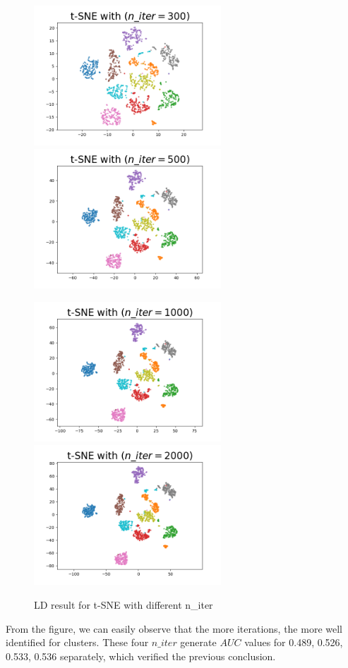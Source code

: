 \begin{figure}[H]
\centering  %
{
\label{Fig.sub.1}
\includegraphics[width=7cm,height=3.5cm\textwidth]{images/t-sne/tsne_niter_300.png}}
{
\label{Fig.sub.2}
\includegraphics[width=7cm,height=3.5cm\textwidth]{images/t-sne/tsne_niter_500.png}}

\centering  %
{
\label{Fig.sub.1}
\includegraphics[width=7cm,height=3.5cm\textwidth]{images/t-sne/tsne_niter_1000.png}}
{
\label{Fig.sub.2}
\includegraphics[width=7cm,height=3.5cm\textwidth]{images/t-sne/tsne_niter_2000.png}}
\caption{LD result for t-SNE with different n\_iter}
\end{figure}

\noindent From the figure, we can easily observe that the more iterations, the more well identified for clusters. These four $n\_iter$ generate $AUC$ values for 0.489, 0.526, 0.533, 0.536 separately, which verified the previous conclusion.

